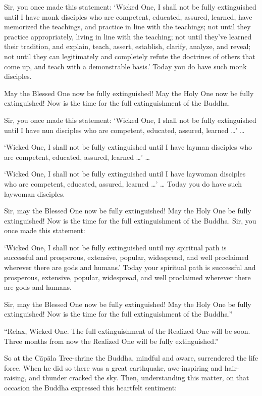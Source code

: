 \documentclass[12pt,openany]{book}%
\begin{document}
Sir, you once made this statement: ‘Wicked One, I shall not be fully extinguished until I have monk disciples who are competent, educated, assured, learned, have memorized the teachings, and practice in line with the teachings; not until they practice appropriately, living in line with the teaching; not until they’ve learned their tradition, and explain, teach, assert, establish, clarify, analyze, and reveal; not until they can legitimately and completely refute the doctrines of others that come up, and teach with a demonstrable basis.’ Today you do have such monk disciples. 

May the Blessed One now be fully extinguished! May the Holy One now be fully extinguished! Now is the time for the full extinguishment of the Buddha. 

Sir, you once made this statement: ‘Wicked One, I shall not be fully extinguished until I have nun disciples who are competent, educated, assured, learned …’ … 

‘Wicked One, I shall not be fully extinguished until I have layman disciples who are competent, educated, assured, learned …’ … 

‘Wicked One, I shall not be fully extinguished until I have laywoman disciples who are competent, educated, assured, learned …’ … Today you do have such laywoman disciples. 

Sir, may the Blessed One now be fully extinguished! May the Holy One be fully extinguished! Now is the time for the full extinguishment of the Buddha. Sir, you once made this statement: 

‘Wicked One, I shall not be fully extinguished until my spiritual path is successful and prosperous, extensive, popular, widespread, and well proclaimed wherever there are gods and humans.’ Today your spiritual path is successful and prosperous, extensive, popular, widespread, and well proclaimed wherever there are gods and humans. 

Sir, may the Blessed One now be fully extinguished! May the Holy One be fully extinguished! Now is the time for the full extinguishment of the Buddha.” 

“Relax, Wicked One. The full extinguishment of the Realized One will be soon. Three months from now the Realized One will be fully extinguished.” 

So at the \textsanskrit{Cāpāla} Tree-shrine the Buddha, mindful and aware, surrendered the life force. When he did so there was a great earthquake, awe-inspiring and hair-raising, and thunder cracked the sky. Then, understanding this matter, on that occasion the Buddha expressed this heartfelt sentiment: 
\end{document}
